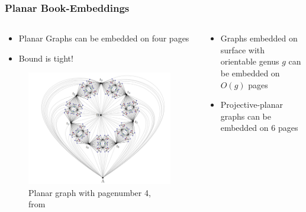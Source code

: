 \documentclass[english]{beamer}
\begin{document}
\begin{frame}
  \frametitle{Planar Book-Embeddings}
  \begin{columns}
    \begin{column}{0.5\textwidth}
      \begin{itemize}
        \item Planar Graphs can be embedded on four pages \cite{yannakakisEmbeddingPlanarGraphs1989}
        \item Bound is tight! \cite{yannakakisPlanarGraphsThat2020,bekosFourPagesAre2020}
      \end{itemize}

      \begin{figure}
        \centering
        \includegraphics[width = \linewidth]{figures/Screenshot 2024-09-26 152422.png}
        \caption{Planar graph with pagenumber 4, from \cite{bekosFourPagesAre2020}}
      \end{figure}
    \end{column}
    \pause
    \begin{column}{0.5\textwidth}
      \begin{itemize}
        \item Graphs embedded on surface with orientable genus $g$ can be embedded on $O(g)$ pages \cite{heathPagenumberGenusGraphs1992}
        \item Projective-planar graphs can be embedded on 6 pages \cite{ozekiBookEmbeddingGraphs2019}
      \end{itemize}
    \end{column}
  \end{columns}
\end{frame}
\end{document}
